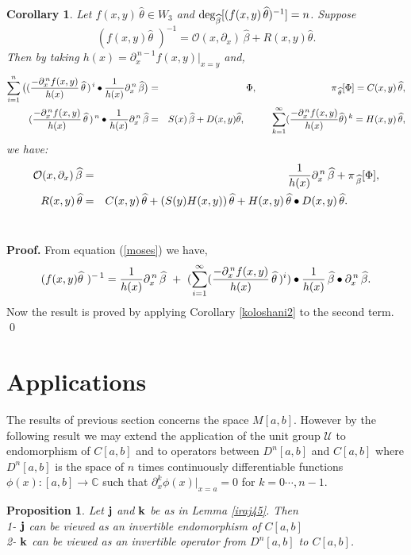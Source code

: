 \documentclass[10pt]{article}
\newcommand{\be}{\begin{equation}}
\newcommand{\ee}{\end{equation}}
\newcommand{\bea}{\begin{eqnarray}}
\newcommand{\eea}{\end{eqnarray}}
\newcommand{\nn}{\nonumber}
\newcommand{\rd}{\partial}
\newcommand{\mc}{{\mathbb C}}
\newcommand{\Deg}{\rm deg_{\widehat{\beta}}}
\newtheorem{cor}{Corollary}
\newtheorem{pro}{Proposition}
\begin{document}
{{\begin{cor}\label{koloshani3}{Let $f(x,y)\,\widehat{\theta}\in W_3$
and ${\Deg}[(f(x,y)\,\widehat{\theta})^{-1}]=n$. Suppose \be
(f(x,y)\widehat\theta\,\,)^{-1}=\mathcal{O}(x,\rd_{x})\,\widehat{\beta}+
R(x,y)\widehat{\theta}. \nn\ee Then by taking
$h(x)=\rd^{\,n-1}_{x}f(x,y)|_{x=y}$ and, \bea \sum^{n}_{i=1}\big(
({-\rd^{\,n}_{x}f(x,y)\over h(x)}\,\widehat\theta\,)^{\, i} \bullet
{1\over
h(x)}\rd_{x}^{\,n}\,\widehat\beta\big)&=&\Phi,\hspace{2.75cm}
{\pi}_{\,\widehat{\theta}}[\Phi]=C(x,y)\,\widehat{\theta}, \nn\\
({-\rd^{\,n}_{x}f(x,y)\over h(x)}\,\widehat\theta\,)^{\, n} \bullet
{1\over h(x)}\rd_{x}^{\,n}\,\widehat\beta &=&
S(x)\,\widehat\beta+D(x,y)\widehat{\theta},\hspace{1cm}
\sum_{k=1}^{\infty} ({-\rd^{\,n}_{x}f(x,y)\over
h(x)}\widehat{\theta})^{\,k}=H(x,y)\,\widehat{\theta}, \nn\eea we
have: \bea \mathcal{O}(x,\rd_{x}) \,\widehat{\beta} &=&
{1\over h(x)}\rd_{x}^{\,n}\,\widehat\beta+{\pi}_{\,\widehat{\beta}}[\Phi], \nn\\
R(x,y)\,\widehat{\theta} &=&
C(x,y)\,\widehat{\theta}+(S(y)H(x,y))\,\widehat{\theta}+H(x,y)\,\widehat{\theta}\bullet
D(x,y)\,\widehat{\theta}.\hspace{1cm}\label{lol}\nn\eea\\}
\end{cor}
{\bf Proof.} From equation (\ref{moses}) we have,
\be(f(x,y)\widehat\theta\,\,)^{-\, 1}={1\over
h(x)}\rd_{x}^{\,n}\,\widehat\beta\,\,+\,\,(\sum^{\infty}_{i=1}
({-\rd^{\,n}_{x}f(x,y)\over h(x)}\,\widehat\theta\,)^{ i})\bullet
{1\over
h(x)}\,\widehat\beta\bullet\rd_{x}^{\,n}\,\widehat\beta.\nn\ee Now
the result is proved by applying Corollary \ref{koloshani2} to the
second term. \qed\\


\section {Applications}
\label{app}

The results of previous section concerns the space $M[a,b]$. However
by the following result we may extend the application of the unit
group $\mathcal U$ to endomorphism of $C[a,b]$ and to operators
between ${D}^{n}[a,b]$ and ${C}[a,b]$ where ${D}^{n}[a,b]$ is the
space of $n$ times continuously differentiable functions
$\phi(x):[a,b]\to\mc$ such that ${\rd^{k}_{x}}\phi(x)|_{x=a}=0$ for
$k=0\cdots,n-1$.

\begin{pro}\label{Haghany}{Let $\bf{j}$ and $\bf{k}$ be as in Lemma
\ref{iraj45}. Then \\
1- $\bf{j}$ can be viewed as an invertible endomorphism of $C[a,b]$\\
2- $\bf{k}$ can be viewed as an invertible operator from
${D}^{n}[a,b]$ to ${C}[a,b]$.}\end{pro}


}}
\end{document}

